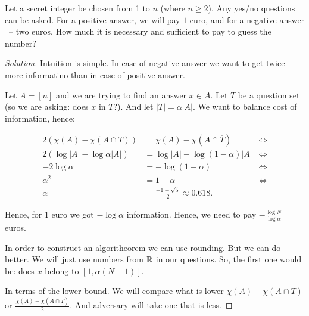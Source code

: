 \begin{example}
    Let a secret integer be chosen from 1 to $n$ (where $n \geq 2$).
    Any yes/no questions can be asked.
    For a positive answer, we will pay $1$ euro, and for a negative answer ~-- two euros.
    How much it is necessary and sufficient to pay to guess the number?
\end{example}
\begin{proof}[Solution]
    Intuition is simple.
    In case of negative answer we want to get twice more informatino than in case of positive answer.

    Let $A = [n]$ and we are trying to find an answer $x \in A$.
    Let $T$ be a question set (so we are asking: does $x$ in $T$?).
    And let $|T| = \alpha |A|$.
    We want to balance cost of information, hence:

    \begin{align*}
        2 (\chi(A) - \chi(A \cap T)) &= \chi(A) - \chi(A \cap \overline T) &\iff \\
        2 (\log |A| - \log \alpha |A|) &= \log |A| - \log (1 - \alpha) |A| &\iff \\
        -2 \log \alpha &= - \log (1 - \alpha) &\iff \\
        \alpha^2 &= 1 - \alpha & \iff\\
        \alpha &= \frac{-1 + \sqrt 5}{2} \approx 0.618.
    \end{align*}

    Hence, for 1 euro we got $- \log \alpha$ information.
    Hence, we need to pay $- \frac{\log N}{\log \alpha}$ euros.

    In order to construct an algoritheorem we can use rounding.
    But we can do better.
    We will just use numbers from $\mathbb{R}$ in our questions.
    So, the first one would be: does $x$ belong to $[1, \alpha (N - 1)]$.

    In terms of the lower bound.
    We will compare what is lower $\chi(A) - \chi(A \cap T)$ or $\frac{\chi(A) - \chi(A \cap \overline T)}{2}$.
    And adversary will take one that is less.
\end{proof}

